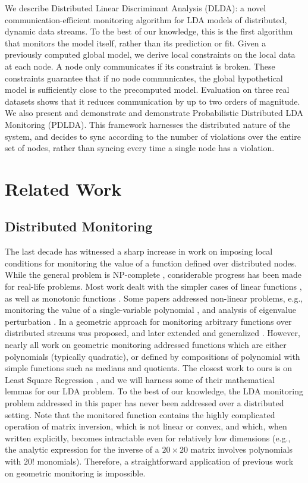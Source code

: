 \documentclass[11pt,twocolumn,varwidth=true,a4paper,fleqn]{article}
\begin{document}
We describe Distributed Linear Discriminant Analysis (DLDA): a novel
communication-efficient monitoring algorithm for LDA models of distributed, dynamic data streams. 
To the best of our knowledge, this is the first algorithm that monitors the
model itself, rather than its prediction or fit. Given a previously computed
global model, we derive local constraints on the local data at each node. A node only communicates
if its constraint is broken. These constraints guarantee that
if no node communicates, the global hypothetical model is
sufficiently close to the precomputed model.
Evaluation on three real datasets shows that it reduces communication by up to
two orders of magnitude. 
We also present and demonstrate and demonstrate 
Probabilistic Distributed LDA Monitoring (PDLDA). This framework harnesses the 
distributed nature of the system, and decides to sync according 
to the number of violations over the entire set of nodes, rather than syncing every
time a single node has a violation.

\section{Related Work}
\subsection{Distributed Monitoring}
The last decade has witnessed a sharp increase in work on imposing local
conditions for monitoring the value of a function defined over distributed nodes. While the general problem is NP-complete
\cite{keren2014geometric}, considerable progress has been made for real-life problems. Most work dealt with the simpler cases of
linear functions \cite{keralapura2006communication, kashyap2008efficient}, as well as monotonic
functions \cite{michel2005klee}.
Some papers addressed non-linear problems, e.g., monitoring
the value of a single-variable polynomial \cite{shah2008handling}, and analysis
of eigenvalue perturbation \cite{huang2007communication}. 
In \cite{sharfman2007geometric} a geometric approach for monitoring arbitrary functions over distributed
streams was proposed, and later extended and generalized
\cite{keren2012shape,lazerson2015monitoring}. However, nearly all work on geometric monitoring addressed
functions which are either polynomials (typically quadratic), or defined by
compositions of polynomial with simple functions such as medians and quotients. 
The closest work to ours is on Least Square Regression
\cite{gabel2015monitoring}, and we will harness some of their mathematical
lemmas for our LDA problem. To the best of our knowledge, the LDA monitoring
problem addressed in this paper has never been addressed over a distributed
setting.
Note that the monitored function contains the highly complicated
operation of matrix inversion, which is not linear or convex,
and which, when written explicitly, becomes intractable even
for relatively low dimensions (e.g., the analytic expression
for the inverse of a $20 \times 20$ matrix involves polynomials with
$20!$ monomials). Therefore, a straightforward application of
previous work on geometric monitoring is impossible.
\end{document}
